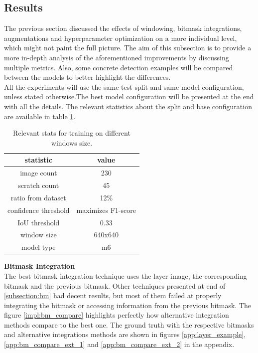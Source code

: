 \subsection{Results}
The previous section discussed the effects of windowing, bitmask integrations, augmentations and hyperparameter optimization on a more individual level, which might not paint the full picture. The aim of this subsection is to provide a more in-depth analysis of the aforementioned improvements by discussing multiple metrics. Also, some concrete detection examples will be compared between the models to better highlight the differences. \\
All the experiments will use the same test split and same model configuration, unless stated otherwise.The best model configuration will be presented at the end with all the details. The relevant statistics about the split and base configuration are available in table \ref{impl:test_split_stats}.

\begin{table}[!h]
  \centering
    \begin{tabular}{ ||c|c|||}
    \hline
    statistic & value \\ [0.5ex]
    \hline\hline
    image count & 230 \\
    scratch count & 45 \\
    ratio from dataset & 12\% \\
    confidence threshold & maximizes F1-score \\
    IoU threshold & 0.33 \\
    window size & 640x640 \\
    model type & m6 \\
    \hline
    \end{tabular}
  \caption{Relevant stats for training on different windows size.}
  \label{impl:test_split_stats}
\end{table}



\textbf{Bitmask Integration} \\
The best bitmask integration technique uses the layer image, the corresponding bitmask and the previous bitmask. Other techniques presented at end of \ref{subsection:bm} had decent results, but most of them failed at properly integrating the bitmask or accessing information from the previous bitmask. The figure \ref{impl:bm_compare} highlights perfectly how alternative integration methods compare to the best one. The ground truth with the respective bitmasks and alternative integrations methods are shown in figures \ref{app:layer_example}, \ref{app:bm_compare_ext_1} and \ref{app:bm_compare_ext_2} in the appendix.

